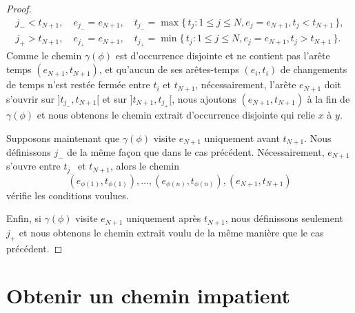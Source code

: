 \documentclass[titlepage,a4paper,12pt]{article}
\newcounter{d}
\newcounter{t}
\newcounter{p}
\newcounter{c}
\newcounter{a}
\newcounter{l}
\begin{document}
\begin{proof}
\begin{align*}
{j_-}< t_{N+1},\quad e_{j_-} = e_{N+1},\quad t_{j_-} = \max \big\{\,t_j:1\leqslant j \leqslant N, e_j = e_{N+1}, t_j < t_{N+1}\,\big\},\\
{j_+}> t_{N+1},\quad e_{j_+} = e_{N+1},\quad t_{j_+} = \min \big\{\,t_j:1\leqslant j \leqslant N, e_j = e_{N+1}, t_j > t_{N+1}\,\big\}.
\end{align*}
Comme le chemin $\gamma(\phi)$ est d'occurrence disjointe et ne contient pas l'arête temps $(e_{N+1},t_{N+1})$, et qu'aucun de ses arêtes-temps $(e_i,t_i)$ de changements de temps n'est restée fermée entre $t_i$ et $t_{N+1}$, nécessairement, l'arête $e_{N+1}$ doit s'ouvrir sur $]t_{j_-},t_{N+1}[$ et sur $]t_{N+1},t_{j_+}[$, nous ajoutons $(e_{N+1},t_{N+1})$ à la fin de $\gamma(\phi)$ et nous obtenons le chemin extrait d'occurrence disjointe qui relie $x$ à $y$.

Supposons maintenant que $\gamma(\phi)$ visite $e_{N+1}$ uniquement avant $t_{N+1}$. Nous définissons $j_-$ de la même façon que dans le cas précédent. Nécessairement, $e_{N+1}$ s'ouvre entre $t_{j_-}$ et $t_{N+1}$, alors le chemin $$(e_{\phi(1)},t_{\phi(1)}),\dots, (e_{\phi(n)},t_{\phi(n)}),(e_{N+1},t_{N+1})$$ vérifie les conditions voulues.

Enfin, si $\gamma(\phi)$ visite $e_{N+1}$ uniquement après $t_{N+1}$, nous définissons seulement $j_+$ et nous obtenons le chemin extrait voulu de la même manière que le cas précédent.
\end{proof}

\section{Obtenir un chemin impatient}
\end{document}
